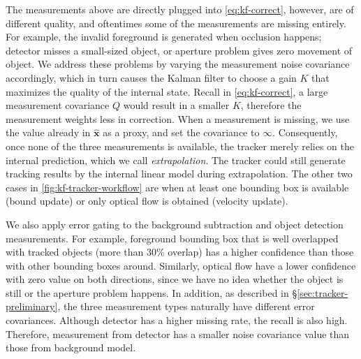 The measurements above are directly plugged into \ref{eq:kf-correct}, however, are of different quality, and oftentimes some of the measurements are missing entirely. For example, the invalid foreground is generated when occlusion happens; detector misses a small-sized object, or aperture problem gives zero movement of object.
We address these problems by varying the measurement noise covariance accordingly, which in turn causes the Kalman filter to choose a gain $K$ that maximizes the quality of the internal state. Recall in \ref{eq:kf-correct}, a large measurement covariance $Q$ would result in a smaller $K$, therefore the measurement weights less in correction. When a measurement is missing, we use the value already in $\mathbf{\hat x}$ as a proxy, and set the covariance to $\infty$. Consequently, once none of the three measurements is available, the tracker merely relies on the internal prediction, which we call \emph{extrapolation}. The tracker could still generate tracking results by the internal linear model during extrapolation. The other two cases in \ref{fig:kf-tracker-workflow} are when at least one bounding box is available (bound update) or only optical flow is obtained (velocity update).

We also apply error gating to the background subtraction and object detection measurements. %
For example, foreground bounding box that is well overlapped with tracked objects (more than $30\%$ overlap) has a higher confidence than those with other bounding boxes around. Similarly, optical flow have a lower confidence with zero value on both directions, since we have no idea whether the object is still or the aperture problem happens.
In addition, as described in \S\ref{sec:tracker-preliminary}, the three measurement types naturally have different error covariances. Although detector has a higher missing rate, the recall is also high. Therefore, measurement from detector has a smaller noise covariance value than those from background model.

